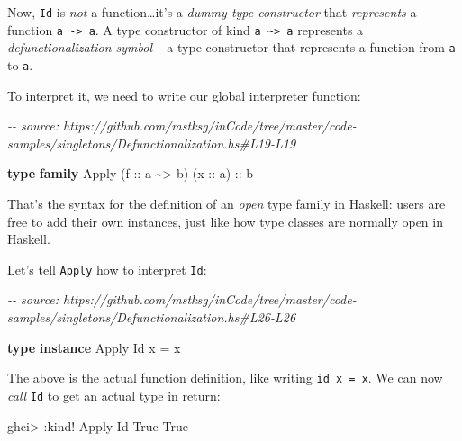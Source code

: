 \documentclass[]{article}
\newenvironment{Shaded}{}{}
\newcommand{\CommentTok}[1]{\textcolor[rgb]{0.38,0.63,0.69}{\textit{#1}}}
\newcommand{\DataTypeTok}[1]{\textcolor[rgb]{0.56,0.13,0.00}{#1}}
\newcommand{\KeywordTok}[1]{\textcolor[rgb]{0.00,0.44,0.13}{\textbf{#1}}}
\newcommand{\NormalTok}[1]{#1}
\newcommand{\OperatorTok}[1]{\textcolor[rgb]{0.40,0.40,0.40}{#1}}
\newcommand{\OtherTok}[1]{\textcolor[rgb]{0.00,0.44,0.13}{#1}}
\begin{document}
Now, \texttt{Id} is \emph{not} a function\ldots it's a \emph{dummy type
constructor} that \emph{represents} a function \texttt{a\ -\textgreater{}\ a}. A
type constructor of kind \texttt{a\ \textasciitilde{}\textgreater{}\ a}
represents a \emph{defunctionalization symbol} -- a type constructor that
represents a function from \texttt{a} to \texttt{a}.

To interpret it, we need to write our global interpreter function:

\begin{Shaded}
\begin{Highlighting}[]
\CommentTok{{-}{-} source: https://github.com/mstksg/inCode/tree/master/code{-}samples/singletons/Defunctionalization.hs\#L19{-}L19}

\KeywordTok{type} \KeywordTok{family} \DataTypeTok{Apply}\NormalTok{ (}\OtherTok{f ::}\NormalTok{ a }\OperatorTok{\textasciitilde{}\textgreater{}}\NormalTok{ b) (}\OtherTok{x ::}\NormalTok{ a)}\OtherTok{ ::}\NormalTok{ b}
\end{Highlighting}
\end{Shaded}

That's the syntax for the definition of an \emph{open} type family in Haskell:
users are free to add their own instances, just like how type classes are
normally open in Haskell.

Let's tell \texttt{Apply} how to interpret \texttt{Id}:

\begin{Shaded}
\begin{Highlighting}[]
\CommentTok{{-}{-} source: https://github.com/mstksg/inCode/tree/master/code{-}samples/singletons/Defunctionalization.hs\#L26{-}L26}

\KeywordTok{type} \KeywordTok{instance} \DataTypeTok{Apply} \DataTypeTok{Id}\NormalTok{ x }\OtherTok{=}\NormalTok{ x}
\end{Highlighting}
\end{Shaded}

The above is the actual function definition, like writing \texttt{id\ x\ =\ x}.
We can now \emph{call} \texttt{Id} to get an actual type in return:

\begin{Shaded}
\begin{Highlighting}[]
\NormalTok{ghci}\OperatorTok{\textgreater{}} \OperatorTok{:}\NormalTok{kind}\OperatorTok{!} \DataTypeTok{Apply} \DataTypeTok{Id} \DataTypeTok{\textquotesingle{}True}
\DataTypeTok{\textquotesingle{}True}
\end{Highlighting}
\end{Shaded}
\end{document}

